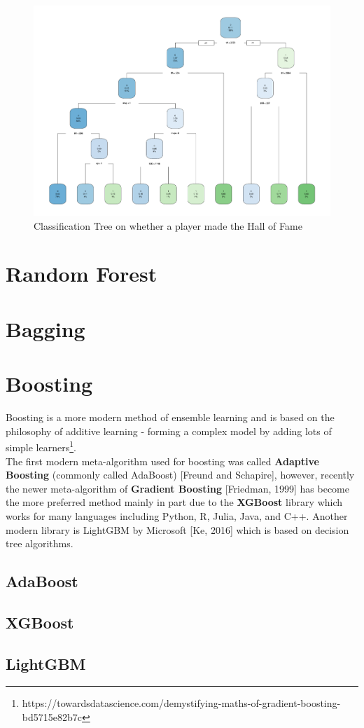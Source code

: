 \documentclass[11pt,a4paper]{report}
\begin{document}
\begin{figure}[ht]
    \centering
    \includegraphics[width = 12cm]{photographs/hofclass.pdf}
    \caption{Classification Tree on whether a player made the Hall of Fame}
    \label{fig:hof}
\end{figure}

\chapter{Random Forest}

\chapter{Bagging}


\chapter{Boosting}
Boosting is a more modern method of ensemble learning and is based on the philosophy of additive learning - forming a complex model by adding lots of simple learners\footnote{https://towardsdatascience.com/demystifying-maths-of-gradient-boosting-bd5715e82b7c}.\\
\bigskip
The first modern meta-algorithm used for boosting was called \textbf{Adaptive Boosting} (commonly called AdaBoost) [Freund and Schapire], however, recently the newer meta-algorithm of \textbf{Gradient Boosting} [Friedman, 1999] has become the more preferred method mainly in part due to the \textbf{XGBoost} library which works for many languages including Python, R, Julia, Java, and C++. Another modern library is LightGBM by Microsoft [Ke, 2016] which is based on decision tree algorithms.

\section{AdaBoost}


\section{XGBoost}

\section{LightGBM}




\end{document}
